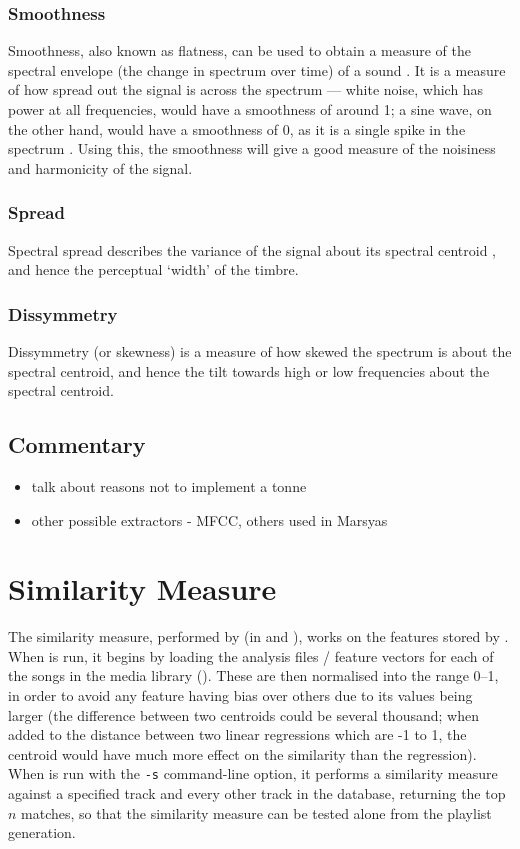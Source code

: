 \subsubsection{Smoothness}

Smoothness, also known as flatness, can be used to obtain a measure of the spectral envelope (the change in spectrum over time) of a sound \citep{Klapuri2003}. It is a measure of how spread out the signal is across the spectrum --- white noise, which has power at all frequencies, would have a smoothness of around 1; a sine wave, on the other hand, would have a smoothness of 0, as it is a single spike in the spectrum \citep{Peeters2004}. Using this, the smoothness will give a good measure of the noisiness and harmonicity of the signal.
\subsubsection{Spread}

Spectral spread describes the variance of the signal about its spectral centroid \citep{Peeters2004}, and hence the perceptual `width' of the timbre.
\subsubsection{Dissymmetry}

Dissymmetry (or skewness) is a measure of how skewed the spectrum is about the spectral centroid, and hence the tilt towards high or low frequencies about the spectral centroid.
\subsection{Commentary}
\begin{itemize}
	\item talk about reasons not to implement a tonne
	\item other possible extractors - MFCC, others used in Marsyas
\end{itemize}
\section{Similarity Measure}
\label{text:method:similarity_measure}
The similarity measure, performed by  (in  and ), works on the features stored by . When  is run, it begins by loading the analysis files / feature vectors for each of the songs in the media library (). These are then normalised into the range 0--1, in order to avoid any feature having bias over others due to its values being larger (the difference between two centroids could be several thousand; when added to the distance between two linear regressions which are -1 to 1, the centroid would have much more effect on the similarity than the regression). When  is run with the \texttt{-s} command-line option, it performs a similarity measure against a specified track and every other track in the database, returning the top $n$ matches, so that the similarity measure can be tested alone from the playlist generation.

